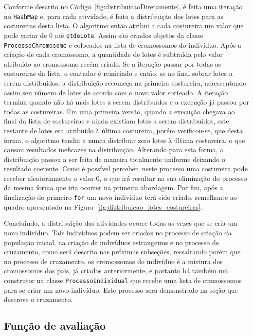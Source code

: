 \par Conforme descrito no Código~\ref{fig:distribuicaoDiretamente}, é feita uma
iteração no \texttt{HashMap} e, para cada atividade, é feita a distribuição dos lotes para
as costureiras desta lista. O algoritmo então atribui a cada costureira um valor
que pode variar de 0 até \texttt{qtdeLote}. Assim são criados objetos da classe \texttt{ProcessoChromosome} 
e colocados na lista de cromossomos do indivíduo. Após a criação de cada cromossomo, a quantidade de
lotes é subtraída pelo valor atribuído ao cromossomo recém criado.
Se a iteração passar por todas as costureiras da lista, o contador é reiniciado e então, se ao final sobrar 
lotes a serem distribuídos, a distribuição recomeça na primeira costureira, acrescentando assim seu 
número de lotes de acordo com o novo valor sorteado. A iteração termina quando não há mais lotes a serem 
distribuídos e a execução já passou por todas as costureiras. Em uma primeira versão, quando a execução chegava
ao final da lista de costureiras e ainda existiam lotes a serem distribuídos, este restante de lotes era atribuído
à última costureira, porém verificou-se, que desta forma, o algoritmo tendia a nunca distribuir zero lotes à última
costureira, o que causou resultados ineficazes na distribuição. Alterando para esta forma, a distribuição  passou a 
ser feita de maneira totalmente uniforme deixando o resultado coerente.
Como é possível perceber, neste processo uma costureira pode receber aleatoriamente o valor 0, o que irá resultar na 
sua eliminação do processo da mesma forma que iria ocorrer na primeira abordagem. Por fim, após a finalização do primeiro
\texttt{for} um novo indivíduo terá sido criado, semelhante ao quadro
apresentado na Figura~\ref{fig:distribuicao_lotes_costureiras}.

\par Concluindo, a distribuição das atividades ocorre todas as vezes que se cria um novo indivíduo.
Tais indivíduos podem ser criados no processo de criação da população inicial, na criação de 
indivíduos estrangeiros e no processo de cruzamento, como será descrito nas próximas subseções,
ressaltando porém que no processo de cruzamento, os cromossomos do indivíduo é a mistura dos cromossomos dos pais,
já criados anteriormente, e portanto há também um construtor na classe \texttt{ProcessoIndividual} que recebe uma lista de 
cromossomos para se criar um novo indivíduo. Este processo será demonstrado na seção que descreve o cruzamento.


\subsection{Função de avaliação}

